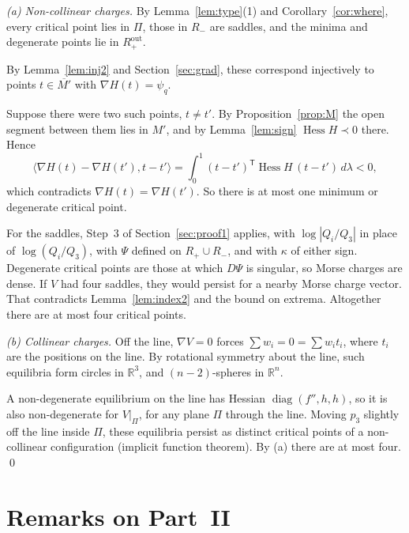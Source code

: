 \documentclass[11pt]{amsart}
\theoremstyle{remark}
\newcommand{\R}{\mathbb{R}}
\DeclareMathOperator{\Hess}{Hess}
\begin{document}
\emph{(a) Non-collinear charges.} By Lemma~\ref{lem:type}(1) and Corollary~\ref{cor:where}, every critical point lies
in $\Pi$, those in $R_-$ are saddles, and the minima and degenerate points lie in $R_+^{\mathrm{out}}$.

By Lemma~\ref{lem:inj2} and Section~\ref{sec:grad}, these correspond injectively to points $t\in\overline{M'}$ with
$\nabla H(t)=\psi_q$.

Suppose there were two such points, $t\ne t'$. By Proposition~\ref{prop:M} the open segment between them lies in $M'$,
and by Lemma~\ref{lem:sign} $\Hess H\prec0$ there. Hence
\[
  \langle\nabla H(t)-\nabla H(t'),t-t'\rangle=\int_0^1(t-t')^{\mathsf T}\Hess H\,(t-t')\,d\lambda<0,
\]
which contradicts $\nabla H(t)=\nabla H(t')$. So there is at most one minimum or degenerate critical point.

For the saddles, Step~3 of Section~\ref{sec:proof1} applies, with $\log|Q_i/Q_3|$ in place of $\log(Q_i/Q_3)$,
with $\Psi$ defined on $R_+\cup R_-$, and with $\kappa$ of either sign. Degenerate critical points are those at which
$D\Psi$ is singular, so Morse charges are dense. If $V$ had four saddles, they would persist for a nearby Morse charge
vector. That contradicts Lemma~\ref{lem:index2} and the bound on extrema. Altogether there are at most four critical
points.

\emph{(b) Collinear charges.} Off the line, $\nabla V=0$ forces $\sum w_i=0=\sum w_it_i$, where $t_i$ are the positions
on the line. By rotational symmetry about the line, such equilibria form circles in $\R^3$, and $(n-2)$-spheres in
$\R^n$.

A non-degenerate equilibrium on the line has Hessian $\operatorname{diag}(f'',h,h)$, so it is also non-degenerate for
$V|_\Pi$, for any plane $\Pi$ through the line. Moving $p_3$ slightly off the line inside $\Pi$, these equilibria
persist as distinct critical points of a non-collinear configuration (implicit function theorem). By (a) there are at
most four. \qed

\section{Remarks on Part~II}\label{sec:rem2}
\end{document}
